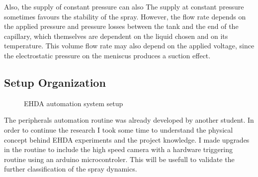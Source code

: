 \begin{enumerate}[a)]
  
  Also, the supply of constant pressure can also 
    \cite{prunet}
  The supply at constant pressure sometimes favours the stability of the spray. However, the flow rate depends on the applied pressure and pressure losses between the tank and the end of the capillary, which themselves are dependent on the liquid chosen and on its temperature. This volume flow rate may also depend on the applied voltage, since the electrostatic pressure on the meniscus produces a suction effect.


  \end{enumerate}



\subsection{Setup Organization}
\label{subsec:setup_organization}


\begin{figure}[H]
  \centering
  \caption{EHDA automation system setup}
  \label{fig:setup_pic}
\end{figure}


The peripherals automation routine was already developed by another student. In order to continue the research I took some time to understand the physical concept behind EHDA experiments and the project knowledge.
I made upgrades in the routine to include the high speed camera with a hardware triggering routine using an arduino microcontroler. This will be usefull to validate the further classification of the spray dynamics.

